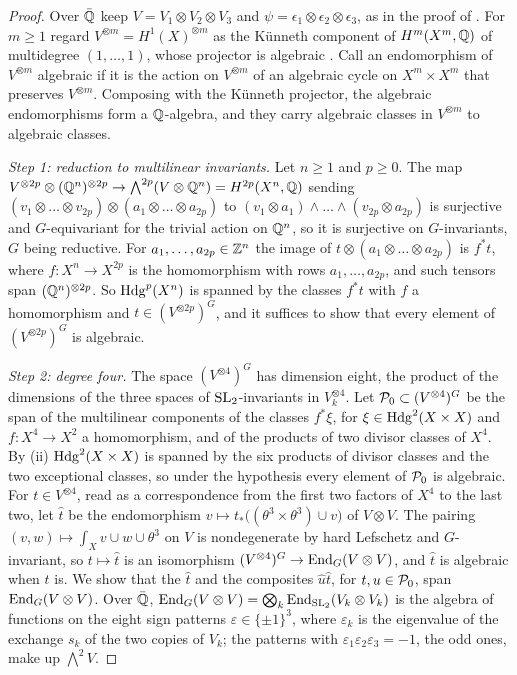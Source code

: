 \begin{proof}
Over $\bar{\mathbb{Q}}$ keep $V=V_{1}\otimes V_{2}\otimes V_{3}$ and
$\psi=\epsilon_{1}\otimes\epsilon_{2}\otimes\epsilon_{3}$, as in the proof of
. For $m\ge1$ regard $V^{\otimes m}=H^{1}(X)^{\otimes m}$
as the K\"unneth component of $H^{m}(X^{m},\mathbb{Q})$ of multidegree
$(1,\dots,1)$, whose projector is algebraic \cite[\S2]{Kle68}. Call an
endomorphism of $V^{\otimes m}$ algebraic if it is the action on
$V^{\otimes m}$ of an algebraic cycle on $X^{m}\times X^{m}$ that preserves
$V^{\otimes m}$. Composing with the K\"unneth projector, the algebraic
endomorphisms form a $\mathbb{Q}$-algebra, and they carry algebraic classes in
$V^{\otimes m}$ to algebraic classes.

\emph{Step 1: reduction to multilinear invariants.} Let $n\ge1$ and $p\ge0$.
The map $V^{\otimes2p}\otimes(\mathbb{Q}^{n})^{\otimes2p}\to
\bigwedge^{2p}(V\otimes\mathbb{Q}^{n})=H^{2p}(X^{n},\mathbb{Q})$ sending
$(v_{1}\otimes\dots\otimes v_{2p})\otimes(a_{1}\otimes\dots\otimes a_{2p})$ to
$(v_{1}\otimes a_{1})\wedge\dots\wedge(v_{2p}\otimes a_{2p})$ is surjective
and $G$-equivariant for the trivial action on $\mathbb{Q}^{n}$, so it is surjective
on $G$-invariants, $G$ being reductive. For $a_{1},\dots,a_{2p}\in\mathbb{Z}^{n}$
the image of $t\otimes(a_{1}\otimes\dots\otimes a_{2p})$ is $f^{*}t$, where
$f\colon X^{n}\to X^{2p}$ is the homomorphism with rows $a_{1},\dots,a_{2p}$,
and such tensors span $(\mathbb{Q}^{n})^{\otimes2p}$. So $\mathrm{Hdg}^{p}(X^{n})$ is
spanned by the classes $f^{*}t$ with $f$ a homomorphism and
$t\in(V^{\otimes2p})^{G}$, and it suffices to show that every element of
$(V^{\otimes2p})^{G}$ is algebraic.

\emph{Step 2: degree four.} The space $(V^{\otimes4})^{G}$ has dimension
eight, the product of the dimensions of the three spaces of
$\operatorname{SL}_{2}$-invariants in $V_{k}^{\otimes4}$. Let $\mathcal{P}_{0}\subset
(V^{\otimes4})^{G}$ be the span of the multilinear components of the classes
$f^{*}\xi$, for $\xi\in\mathrm{Hdg}^{2}(X\times X)$ and $f\colon X^{4}\to X^{2}$ a
homomorphism, and of the products of two divisor classes of $X^{4}$. By
(ii) $\mathrm{Hdg}^{2}(X\times X)$ is spanned by the six
products of divisor classes and the two exceptional classes, so under the
hypothesis every element of $\mathcal{P}_{0}$ is algebraic. For
$t\in V^{\otimes4}$, read as a correspondence from the first two factors of
$X^{4}$ to the last two, let $\hat{t}$ be the endomorphism
$v\mapsto t_{*}\bigl((\theta^{3}\times\theta^{3})\cup v\bigr)$ of
$V\otimes V$. The pairing $(v,w)\mapsto\int_{X}v\cup w\cup\theta^{3}$ on $V$
is nondegenerate by hard Lefschetz and $G$-invariant, so $t\mapsto\hat{t}$
is an isomorphism $(V^{\otimes4})^{G}\to\operatorname{End}_{G}(V\otimes V)$, and $\hat{t}$
is algebraic when $t$ is. We show that the $\hat{t}$ and the composites
$\hat{u}\hat{t}$, for $t,u\in\mathcal{P}_{0}$, span $\operatorname{End}_{G}(V\otimes V)$. Over
$\bar{\mathbb{Q}}$, $\operatorname{End}_{G}(V\otimes V)=\bigotimes_{k}\operatorname{End}_{\operatorname{SL}_{2}}(V_{k}\otimes
V_{k})$ is the algebra of functions on the eight sign patterns
$\varepsilon\in\{\pm1\}^{3}$, where $\varepsilon_{k}$ is the eigenvalue of the
exchange $s_{k}$ of the two copies of $V_{k}$; the patterns with
$\varepsilon_{1}\varepsilon_{2}\varepsilon_{3}=-1$, the odd ones, make up
$\bigwedge^{2}V$.


\end{proof}
